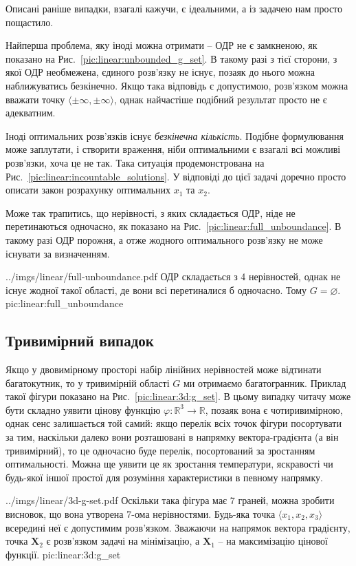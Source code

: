 \documentclass[\main/book.tex]{subfiles}
\begin{document}
Описані раніше випадки, взагалі кажучи, є ідеальними, а із задачею нам просто пощастило.

Найперша проблема, яку іноді можна отримати -- ОДР не є замкненою, як показано на Рис.~\ref{pic:linear:unbounded_g_set}. В такому разі з тієї сторони, з якої ОДР необмежена, єдиного розв'язку не існує, позаяк до нього можна наближуватись безкінечно. Якщо така відповідь є допустимою, розв'язком можна вважати точку ${\langle \pm \infty, \pm \infty \rangle}$, однак найчастіше подібний результат просто не є адекватним.

Іноді оптимальних розв'язків існує \textit{безкінечна кількість}. Подібне формулювання може заплутати, і створити враження, ніби оптимальними є взагалі всі можливі розв'язки, хоча це не так. Така ситуація продемонстрована на Рис.~\ref{pic:linear:incountable_solutions}. У відповіді до цієї задачі доречно просто описати закон розрахунку оптимальних $x_1$ та $x_2$.

Може так трапитись, що нерівності, з яких складається ОДР, ніде не перетинаються одночасно, як показано на Рис.~\ref{pic:linear:full_unboundance}. В такому разі ОДР порожня, а отже жодного оптимального розв'язку не може існувати за визначенням.

\illustration
 {../imgs/linear/full-unboundance.pdf}
 {ОДР складається з 4 нерівностей, однак не існує жодної такої області, де вони всі перетиналися б одночасно. Тому $G = \varnothing$.}
 {pic:linear:full_unboundance}

\subsection{Тривимірний випадок}

Якщо у двовимірному просторі набір лінійних нерівностей може відтинати багатокутник, то у тривимірній області $G$ ми отримаємо багатогранник. Приклад такої фігури показано на Рис.~\ref{pic:linear:3d:g_set}. В цьому випадку читачу може бути складно уявити цінову функцію ${\varphi: \mathbb{R}^3 \rightarrow \mathbb{R}}$, позаяк вона є чотиривимірною, однак сенс залишається той самий: якщо перелік всіх точок фігури посортувати за тим, наскільки \flqq{}далеко\frqq{} вони розташовані в напрямку вектора-градієнта (а він тривимірний), то це одночасно буде перелік, посортований за зростанням оптимальності. Можна ще уявити це як зростання температури, яскравості чи будь-якої іншої простої для розуміння характеристики в певному напрямку.

\illustration
 {../imgs/linear/3d-g-set.pdf}
 {Оскільки така фігура має 7 граней, можна зробити висновок, що вона утворена 7-ома нерівностями. Будь-яка точка $\langle x_1, x_2, x_3 \rangle$ всередині неї є допустимим розв'язком. Зважаючи на напрямок вектора градієнту, точка $\mathbf{X}_2$ є розв'язком задачі на мінімізацію, а $\mathbf{X}_1$ -- на максимізацію цінової функції.}
 {pic:linear:3d:g_set}
 
\end{document}
